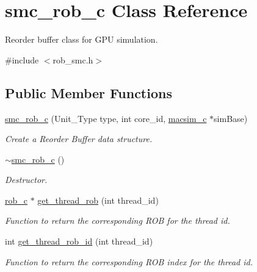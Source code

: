 \hypertarget{classsmc__rob__c}{
\section{smc\_\-rob\_\-c Class Reference}
\label{classsmc__rob__c}
}


Reorder buffer class for GPU simulation.  




{\ttfamily \#include $<$rob\_\-smc.h$>$}

\subsection*{Public Member Functions}
\begin{DoxyCompactItemize}
\item 
\hyperlink{classsmc__rob__c_a3491baac52db612930e0932193fb061b}{smc\_\-rob\_\-c} (Unit\_\-Type type, int core\_\-id, \hyperlink{classmacsim__c}{macsim\_\-c} $\ast$simBase)
\begin{DoxyCompactList}\small\item\em Create a Reorder Buffer data structure. \item\end{DoxyCompactList}\item 
\hyperlink{classsmc__rob__c_a423a152e2dbf5b69a199832581f492e5}{$\sim$smc\_\-rob\_\-c} ()
\begin{DoxyCompactList}\small\item\em Destructor. \item\end{DoxyCompactList}\item 
\hyperlink{classrob__c}{rob\_\-c} $\ast$ \hyperlink{classsmc__rob__c_afe3b3b1d744c1b9571c6fcdb0b844b93}{get\_\-thread\_\-rob} (int thread\_\-id)
\begin{DoxyCompactList}\small\item\em Function to return the corresponding ROB for the thread id. \item\end{DoxyCompactList}\item 
int \hyperlink{classsmc__rob__c_a53cf88f8da3879fe5f519d31d360a96e}{get\_\-thread\_\-rob\_\-id} (int thread\_\-id)
\begin{DoxyCompactList}\small\item\em Function to return the corresponding ROB index for the thread id. \item\end{DoxyCompactList}\item 

\end{DoxyCompactItemize}
